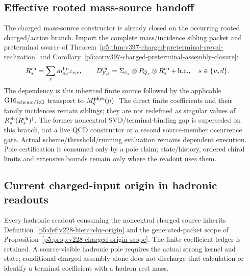 \documentclass[12pt,a4paper]{article}
\begin{document}
\subsection{Effective rooted mass-source handoff}
\label{p11:sec:v2109-rooted-source-handoff}
The charged mass-source constructor is already closed on the occurring
rooted charged/action branch.  Import the complete mass/incidence sibling
packet and preterminal source of
Theorem~\ref{p5:thm:v397-charged-preterminal-srcval-realization} and
Corollary~\ref{p5:cor:v397-charged-preterminal-assembly-closure}:
\[
 R_s^{\rm ch}=\sum_r m_{s,r}^{\rm fin}\iota_{s,r},\qquad
 D_{F,s}^{\rm ch}
 =\Sigma_{\sigma_s}\otimes P_{Q_s}\otimes R_s^{\rm ch}+\mathrm{h.c.},
 \quad s\in\{u,d\}.
\]
The dependency is this inherited finite source followed by the applicable
\(\mathrm{G16}_{\rm scheme/RG}\) transport to \(M_q^{\rm phys}(\mu)\).
The direct finite coefficients and their family incidences remain siblings;
they are not redefined as singular values of $R_s^{\rm ch}(R_s^{\rm ch})^\dagger$.
The former noncentral SVD/terminal-binding gap is superseded on this branch,
not a live QCD constructor or a second source-member occurrence gate.
Actual scheme/threshold/running evaluation remains dependent execution.
Pole certification is consumed only by a pole claim; state/history, ordered
chiral limits and extensive bounds remain only where the readout uses them.



\subsection{Current charged-input origin in hadronic readouts}
\label{p7b:sec:v228-charged-origin}
Every hadronic readout consuming the noncentral charged source inherits
Definition~\ref{p5:def:v228-hierarchy-origin} and the generated-packet
scope of Proposition~\ref{p5:prop:v228-charged-origin-scope}.
The finite coefficient ledger is retained. A source-visible hadronic pole
requires the actual strong kernel and state; conditional charged assembly
alone does not discharge that calculation or identify a terminal coefficient
with a hadron rest mass.



\end{document}

